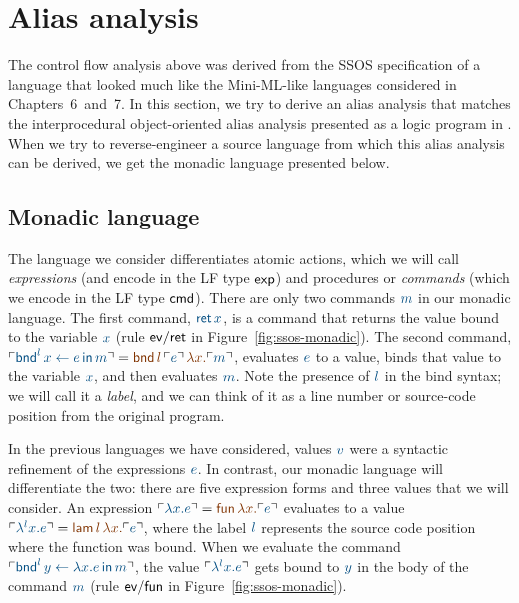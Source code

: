 \section{Alias analysis}

The control flow analysis above was derived from the SSOS
specification of a language that looked much like the Mini-ML-like
languages considered in Chapters~6~and~7.  In this section, we try to
derive an alias analysis that matches the interprocedural
object-oriented alias analysis presented as a logic program in
\cite[Chapter 12.4]{aho07compilers}.  When we try to reverse-engineer
a source language from which this alias analysis can be derived, we
get the monadic language presented below.

\subsection{Monadic language}

The language we consider differentiates atomic actions, which we will
call {\it expressions} (and encode in the LF type ${\sf exp}$) and
procedures or {\it commands} (which we encode in the LF type ${\sf
  cmd}$). There are only two commands $\obj{m}$ in our monadic language. The
first command, $\obj{{\sf ret}\,x}$, is a command that returns the value
bound to the variable $\obj{x}$ (rule ${\sf ev/ret}$ in
Figure~\ref{fig:ssos-monadic}). The second command, $\interp{{\sf
    bnd}^l\, x \leftarrow e \,{\sf in}\,m} = \lf{{\sf
  bnd}\,l\,\interp{e}\,\lambda x.\interp{m}}$, evaluates $\obj{e}$ to a
value, binds that value to the variable $\obj{x}$, and then evaluates
$\obj{m}$. Note the presence of $\obj{l}$ 
in the bind syntax; we will call it a
{\it label}, and we can think of it as a line number or source-code
position from the original program.

In the previous languages we have considered, values $\obj{v}$ were a
syntactic refinement of the expressions $\obj{e}$. In contrast, our monadic
language will differentiate the two: there are five expression forms
and three values that we will consider. An expression $\interp{\lambda
  x.e} = \lf{{\sf fun}\,\lambda x.\interp{e}}$ evaluates to a value
$\interp{\lambda^l x.e} = \lf{{\sf lam}\,l\,\lambda x.\interp{e}}$, where
the label $\obj{l}$ represents the source code position where the function
was bound. When we evaluate the command $\interp{{\sf
    bnd}^l \, y \leftarrow \lambda x.e \,{\sf in}\,m}$, the value
$\interp{\lambda^l x.e}$ gets bound to $\obj{y}$ in the body of the command
$\obj{m}$ (rule ${\sf ev/fun}$ in Figure~\ref{fig:ssos-monadic}).

